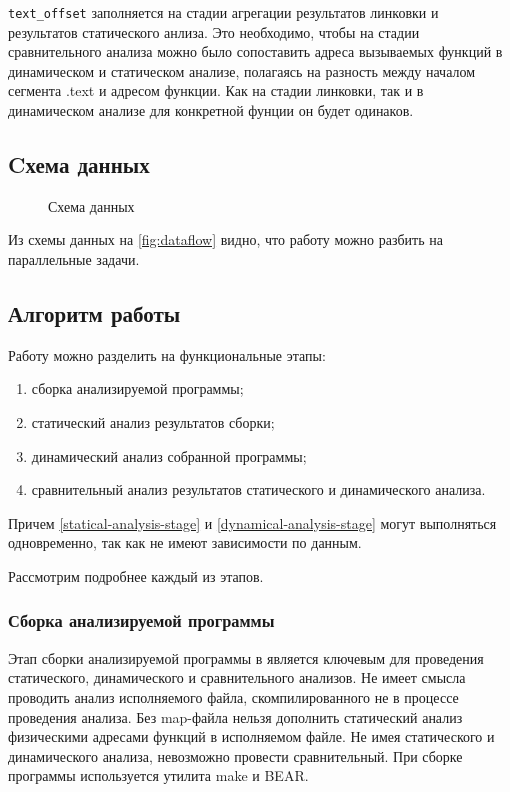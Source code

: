 \texttt{text\_offset} заполняется на стадии агрегации результатов линковки и результатов статического анлиза.
Это необходимо, чтобы на стадии сравнительного анализа можно было сопоставить адреса вызываемых функций в динамическом
и статическом анализе, полагаясь на разность между началом сегмента .text и адресом функции. Как на стадии линковки, так
и в динамическом анализе для конкретной фунции он будет одинаков.


\subsection{Cхема данных}\label{sec:ch2/sec2/sub2}

\begin{figure}[!htbp]
    \centerfloat{
        
    }
    \caption{Схема данных {\ProgModule}\label{fig:dataflow}}
\end{figure}
Из схемы данных на \autoref{fig:dataflow} видно, что работу {\ProgModule} можно разбить на параллельные 
задачи.


\subsection{Алгоритм работы {\ProgModule}}\label{sec:ch2/sec2/sub3}
Работу {\ProgModule} можно разделить на функциональные этапы:
\begin{enumerate}[label={\arabic*)}]
    \item сборка анализируемой программы;
    \item статический анализ результатов сборки\label{statical-analysis-stage};
    \item динамический анализ собранной программы\label{dynamical-analysis-stage};
    \item сравнительный анализ результатов статического и динамического анализа.
\end{enumerate}

Причем \autoref{statical-analysis-stage} и \autoref{dynamical-analysis-stage} могут выполняться
одновременно, так как не имеют зависимости по данным.

Рассмотрим подробнее каждый из этапов.

\subsubsection{Сборка анализируемой программы}\label{sec:ch2/sec2/sub3/sub1}
Этап сборки анализируемой программы в {\ProgModule} является ключевым для 
проведения статического, динамического и сравнительного анализов.
Не имеет смысла проводить анализ исполняемого файла, скомпилированного не в процессе 
проведения анализа. Без map-файла нельзя дополнить статический анализ физическими адресами
функций в исполняемом файле.
Не имея статического и динамического анализа, невозможно провести сравнительный.
При сборке программы используется утилита make и BEAR.

